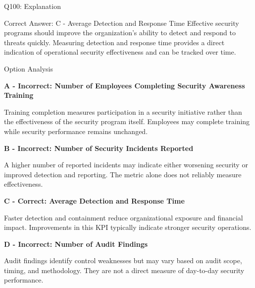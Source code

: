 \documentclass{beamer}
\begin{document}
	\begin{frame}[shrink=10]{Q100: Explanation}
		\footnotesize
		
		\begin{block}{Correct Answer: C - Average Detection and Response Time}
			Effective security programs should improve the organization's
			ability to detect and respond to threats quickly. Measuring
			detection and response time provides a direct indication of
			operational security effectiveness and can be tracked over time.
		\end{block}
		
		\begin{block}{Option Analysis}
			
			\textbf{A - Incorrect: Number of Employees Completing Security Awareness Training}
			
			Training completion measures participation in a security
			initiative rather than the effectiveness of the security
			program itself. Employees may complete training while
			security performance remains unchanged.
			

			
			\textbf{B - Incorrect: Number of Security Incidents Reported}
			
			A higher number of reported incidents may indicate either
			worsening security or improved detection and reporting.
			The metric alone does not reliably measure effectiveness.
			

			
			\textbf{C - Correct: Average Detection and Response Time}
			
			Faster detection and containment reduce organizational
			exposure and financial impact. Improvements in this KPI
			typically indicate stronger security operations.
			

			
			\textbf{D - Incorrect: Number of Audit Findings}
			
			Audit findings identify control weaknesses but may vary
			based on audit scope, timing, and methodology. They are
			not a direct measure of day-to-day security performance.
			
		\end{block}
		

		
	\end{frame}
	
	
\end{document}
